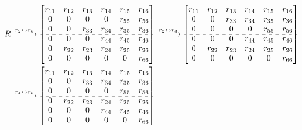 \documentclass{book}
\theoremstyle{remark}
\begin{document}
\begin{multicols}{2}
\iffalse
\begin{align*}
R
& \xrightarrow{r_{2} \leftrightarrow r_{5}}
\begin{bmatrix}
 r_{11} & r_{12} & r_{13} & r_{14} & r_{15} & r_{16}\\
 0      & 0      & 0      & 0      & r_{55} & r_{56}\\
 0      & 0      & r_{33} & r_{34} & r_{35} & r_{36}\\
 \cdashline{1-6}
 0      & 0      & 0 & r_{44} & r_{45} & r_{46}\\
 0 & r_{22} & r_{23} & r_{24} & r_{25} & r_{26}\\
 0      & 0      & 0      & 0      & 0 & r_{66}\\
\end{bmatrix}
\xrightarrow{r_{2} \leftrightarrow r_{3}}
\begin{bmatrix}
 r_{11} & r_{12} & r_{13} & r_{14} & r_{15} & r_{16}\\
 0      & 0      & r_{33} & r_{34} & r_{35} & r_{36}\\
 0      & 0      & 0      & 0      & r_{55} & r_{56}\\
 \cdashline{1-6}
 0      & 0      & 0 & r_{44} & r_{45} & r_{46}\\
 0 & r_{22} & r_{23} & r_{24} & r_{25} & r_{26}\\
 0      & 0      & 0      & 0      & 0 & r_{66}\\
\end{bmatrix} \\
& \xrightarrow{r_{4} \leftrightarrow r_{5}}
\begin{bmatrix}
 r_{11} & r_{12} & r_{13} & r_{14} & r_{15} & r_{16}\\
 0      & 0      & r_{33} & r_{34} & r_{35} & r_{36}\\
 0      & 0      & 0      & 0      & r_{55} & r_{56}\\
 \cdashline{1-6}
 0 & r_{22} & r_{23} & r_{24} & r_{25} & r_{26}\\
 0      & 0      & 0 & r_{44} & r_{45} & r_{46}\\
 0      & 0      & 0      & 0      & 0 & r_{66}\\
\end{bmatrix}

\end{align*}
\end{multicols}
\end{document}
